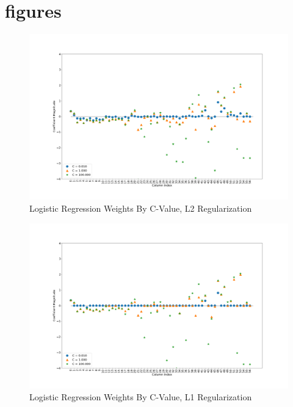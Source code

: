 \documentclass[sigconf]{acmart}
\begin{document}



\section{figures}

\begin{figure}[!ht]
  \centering\includegraphics[width=\columnwidth]{images/weightsl2.png}
  \caption{Logistic Regression Weights By C-Value, L2 Regularization}\label{f:weightsl2}
\end{figure}

\begin{figure}[!ht]
  \centering\includegraphics[width=\columnwidth]{images/weightsl1.png}
  \caption{Logistic Regression Weights By C-Value, L1 Regularization}\label{f:weightsl1}
\end{figure}
\end{document}
